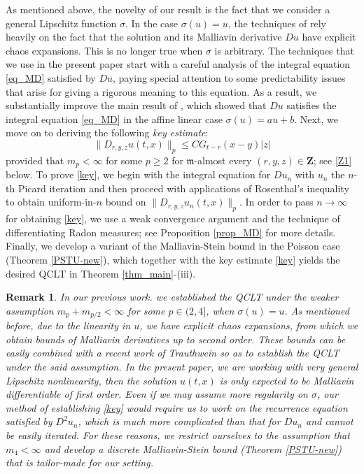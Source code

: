 \documentclass[letterpaper, 11pt,  reqno]{amsart}
\newtheorem{remark}[theorem]{Remark}
\newcommand{\s}{\sigma}
\newcommand{\fm}{\mathfrak{m}}
\numberwithin{equation}{section}
\numberwithin{theorem}{section}
\begin{document}
As mentioned above, the novelty of our result is the fact that we consider a general Lipschitz function $\s$. In the case $\s(u)=u$, the techniques of \cite{BZ23} rely heavily on the fact that the solution and its Malliavin derivative $Du$ have explicit   chaos expansions. This is no longer true when $\s$ is arbitrary. The techniques that we use in the present paper start with 
a careful analysis of the integral equation \eqref{eq_MD} satisfied by $Du$, paying special attention to some predictability issues that arise for giving a rigorous meaning to this equation.
As a result,   we substantially improve the main result of \cite{BN17}, which showed that $Du$ satisfies the integral equation \eqref{eq_MD} in the affine linear case $\s(u)=au+b$. 
 Next,  we move on to deriving the following {\em key estimate}:
\begin{equation}
\label{key}
\|D_{r,y,z}u(t,x)\|_p \leq C G_{t-r}(x-y)|z| 
\end{equation}
provided that $m_p<\infty$ for some $p\geq 2$
for $\fm$-almost every $(r,y,z)\in\mathbf{Z}$; see   \eqref{Z1} below. 
To prove \eqref{key}, we begin with the integral equation for $Du_n$ with   $u_n$  the $n$-th 
Picard iteration and then proceed with applications of  Rosenthal's inequality 
to obtain uniform-in-$n$ bound on $\|D_{r,y,z}u_n(t,x)\|_p$.
In order to pass $n\to\infty$ for obtaining \eqref{key},
we use a weak convergence argument and the technique of differentiating 
Radon measures; see Proposition \ref{prop_MD} for more details. 
Finally, we develop a variant of the Malliavin-Stein bound in the Poisson case (Theorem \ref{PSTU-new}), which together with the key estimate \eqref{key} yields the desired QCLT in 
Theorem \ref{thm_main}-(iii).


\begin{remark}
\rm In our previous work. we established the QCLT
under the weaker assumption $m_{p} + m_{p/2} <\infty$
for some $p\in(2, 4]$, when $\s(u)=u$.
As mentioned before, due to the linearity in $u$, we have explicit 
chaos expansions, from which we obtain bounds of Malliavin derivatives up to second order.
These bounds can be easily combined with a recent work of Trauthwein \cite{Tara}
so as to establish the QCLT under the said assumption. 
In the present paper, we are working with very general Lipschitz nonlinearity, 
then the solution $u(t,x)$ is only expected   to be Malliavin differentiable of first order. 
Even if we may assume more regularity on $\s$, our method of establishing \eqref{key}
would require us to work on   the recurrence equation satisfied by $D^2 u_n$,
which is much more complicated than that for $Du_n$ and cannot be easily iterated. 
For these reasons, we restrict ourselves to the assumption that $m_4 < \infty$
and develop a discrete Malliavin-Stein bound (Theorem \ref{PSTU-new})
that is tailor-made for our setting.  

\end{remark}
\end{document}

